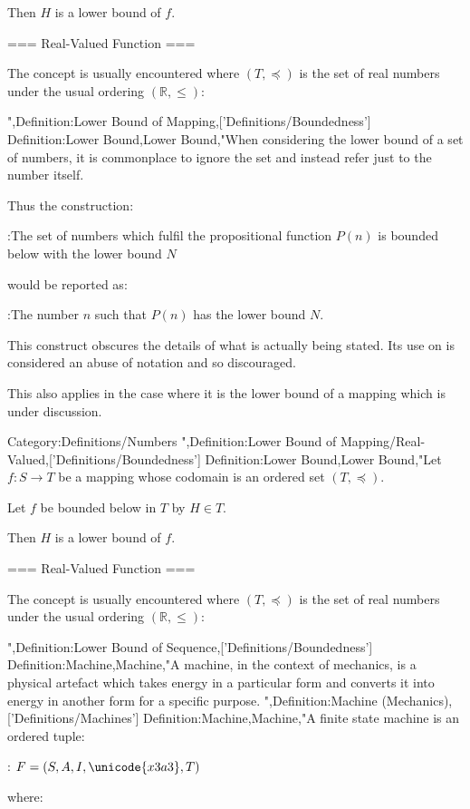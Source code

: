Then $H$ is a lower bound of $f$.


=== Real-Valued Function ===

The concept is usually encountered where $\left( T, \preceq \right)$ is the set of real numbers under the usual ordering $\left( \mathbb R, \le \right)$:

",Definition:Lower Bound of Mapping,['Definitions/Boundedness']
Definition:Lower Bound,Lower Bound,"When considering the lower bound of a set of numbers, it is commonplace to ignore the set and instead refer just to the number itself.

Thus the construction:

:The set of numbers which fulfil the propositional function $P \left({n}\right)$ is bounded below with the lower bound $N$

would be reported as:

:The number $n$ such that $P \left({n}\right)$ has the lower bound $N$.


This construct obscures the details of what is actually being stated. Its use on  is considered an abuse of notation and so discouraged.


This also applies in the case where it is the lower bound of a mapping which is under discussion.


Category:Definitions/Numbers
",Definition:Lower Bound of Mapping/Real-Valued,['Definitions/Boundedness']
Definition:Lower Bound,Lower Bound,"Let $f: S \to T$ be a mapping whose codomain is an ordered set $\left( T, \preceq \right)$.


Let $f$ be bounded below in $T$ by $H \in T$.


Then $H$ is a lower bound of $f$.


=== Real-Valued Function ===

The concept is usually encountered where $\left( T, \preceq \right)$ is the set of real numbers under the usual ordering $\left( \mathbb R, \le \right)$:


",Definition:Lower Bound of Sequence,['Definitions/Boundedness']
Definition:Machine,Machine,"A machine, in the context of mechanics, is a physical artefact which takes energy in a particular form and converts it into energy in another form for a specific purpose.
",Definition:Machine (Mechanics),['Definitions/Machines']
Definition:Machine,Machine,"A finite state machine is an ordered tuple:

: $F = \left({ S, A, I, \unicode{x3a3}, T }\right)$

where:

